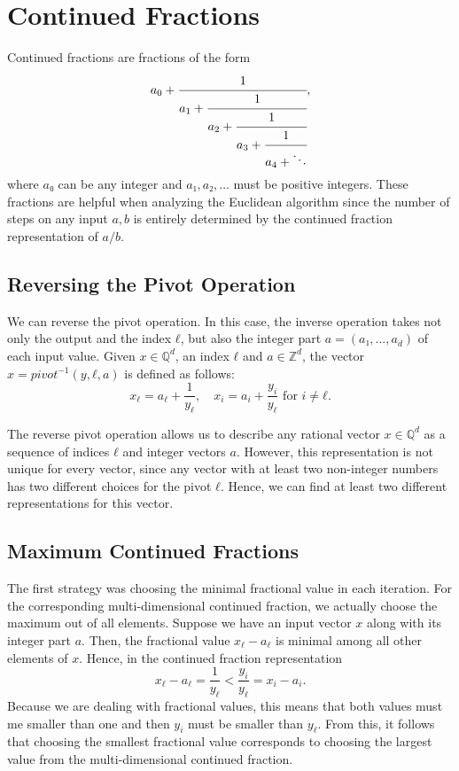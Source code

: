 \chapter{Continued Fractions}

Continued fractions are fractions of the form
\[
  a_0 + \cfrac{1}{a_1 + \cfrac{1}{a_2 + \cfrac{1}{a_3 + \cfrac{1}{a_4 + \ddots}}}},
\]
where $a₀$ can be any integer and $a₁, a₂, \dots$ must be positive integers.
These fractions are helpful when analyzing the Euclidean algorithm since
the number of steps on any input $a, b$ is entirely determined by the continued
fraction representation of $a/b$.

\section{Reversing the Pivot Operation}

We can reverse the pivot operation.
In this case, the inverse operation takes not only the output and the index $ℓ$,
but also the integer part $a = (a₁, \dots, a_d)$ of each input value.
Given $x ∈ ℚ^d$, an index $ℓ$ and $a ∈ ℤ^d$, the vector $x = pivot^{-1}(y, ℓ, a)$ is defined as follows:
\[
  x_ℓ = a_ℓ + \frac{1}{y_ℓ}, \quad x_i = a_i + \frac{y_i}{y_ℓ} \text{ for } i ≠ ℓ.
\]

The reverse pivot operation allows us to describe any rational vector $x ∈ ℚ^d$ as a
sequence of indices $ℓ$ and integer vectors $a$.
However, this representation is not unique for every vector,
since any vector with at least two non-integer numbers has two different
choices for the pivot $ℓ$.
Hence, we can find at least two different representations for this vector.

\section{Maximum Continued Fractions}

The first strategy was choosing the minimal fractional value in each iteration.
For the corresponding multi-dimensional continued fraction,
we actually choose the maximum out of all elements.
Suppose we have an input vector $x$ along with its integer part $a$.
Then, the fractional value $x_ℓ - a_ℓ$ is minimal among all other elements of $x$.
Hence, in the continued fraction representation
\[
  x_ℓ - a_ℓ = \frac{1}{y_ℓ} < \frac{y_i}{y_ℓ} = x_i - a_i.
\]
Because we are dealing with fractional values, this means that both values must
me smaller than one and then $y_i$ must be smaller than $y_ℓ$.
From this, it follows that choosing the smallest fractional value corresponds
to choosing the largest value from the multi-dimensional continued fraction.

